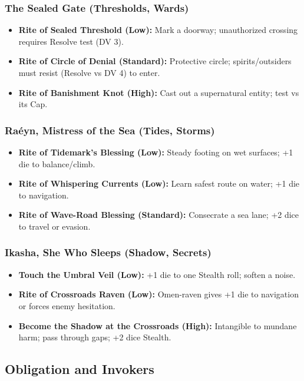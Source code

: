 \subsubsection{The Sealed Gate (Thresholds, Wards)}
\begin{itemize}
  \item \textbf{Rite of Sealed Threshold (Low):} Mark a doorway; unauthorized crossing requires Resolve test (DV 3).
  \item \textbf{Rite of Circle of Denial (Standard):} Protective circle; spirits/outsiders must resist (Resolve vs DV 4) to enter.
  \item \textbf{Rite of Banishment Knot (High):} Cast out a supernatural entity; test vs its Cap.
\end{itemize}

\subsubsection{Ra\'eyn, Mistress of the Sea (Tides, Storms)}
\begin{itemize}
  \item \textbf{Rite of Tidemark's Blessing (Low):} Steady footing on wet surfaces; +1 die to balance/climb.
  \item \textbf{Rite of Whispering Currents (Low):} Learn safest route on water; +1 die to navigation.
  \item \textbf{Rite of Wave-Road Blessing (Standard):} Consecrate a sea lane; +2 dice to travel or evasion.
\end{itemize}

\subsubsection{Ikasha, She Who Sleeps (Shadow, Secrets)}
\begin{itemize}
  \item \textbf{Touch the Umbral Veil (Low):} +1 die to one Stealth roll; soften a noise.
  \item \textbf{Rite of Crossroads Raven (Low):} Omen-raven gives +1 die to navigation or forces enemy hesitation.
  \item \textbf{Become the Shadow at the Crossroads (High):} Intangible to mundane harm; pass through gaps; +2 dice Stealth.
\end{itemize}

\subsection{Obligation and Invokers}

